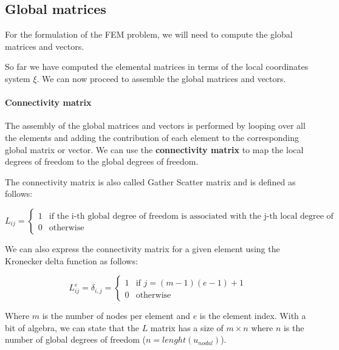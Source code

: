\subsection{Global matrices}
\label{subsec:global_matrices}

For the formulation of the FEM problem, we will need to compute the global matrices and vectors.

So far we have computed the elemental matrices in terms of the local coordinates system $\xi$.
We can now proceed to assemble the global matrices and vectors.

\paragraph{Connectivity matrix}

The assembly of the global matrices and vectors is performed by looping over all the elements and adding the contribution of each element to the corresponding global matrix or vector.
We can use the \textbf{connectivity matrix} to map the local degrees of freedom to the global degrees of freedom.

The connectivity matrix is also called Gather Scatter matrix and is defined as follows:

\begin{equation}
    L_{ij} =
    \begin{cases}
        1 & \text{if the i-th global degree of freedom is associated with the j-th local degree of freedom} \\
        0 & \text{otherwise}
    \end{cases}
\end{equation}

We can also express the connectivity matrix for a given element using the Kronecker delta function as follows:

\begin{equation}
    L_{ij}^e = \delta_{i,j} =
    \begin{cases}
        1 & \text{if } j = (m-1)(e-1) + 1 \\
        0 & \text{otherwise}
    \end{cases}
\end{equation}

Where $m$ is the number of nodes per element and $e$ is the element index.
With a bit of algebra, we can state that the $L$ matrix has a size of $m \times n$ where $n$ is the number of global degrees of freedom ($n = lenght(u_{nodal})$).

